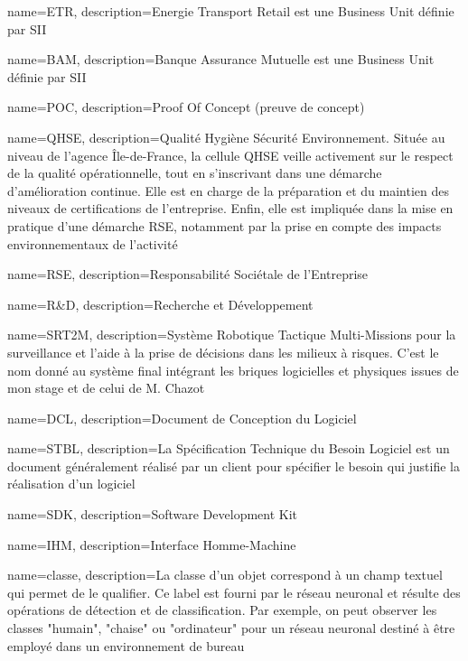 {
  name={ETR},
    description={Energie Transport Retail est une Business Unit définie par SII}
}

{
  name={BAM},
    description={Banque Assurance Mutuelle est une Business Unit définie par SII}
}

{
  name={POC},
    description={Proof Of Concept (preuve de concept)}
}

{
  name={QHSE},
    description={Qualité Hygiène Sécurité Environnement. Située au niveau de l'agence \^{I}le-de-France, la cellule QHSE veille activement sur le respect de la qualité opérationnelle, tout en s'inscrivant dans une démarche d'amélioration continue. 
    Elle est en charge de la préparation et du maintien des niveaux de certifications de l'entreprise.
    Enfin, elle est impliquée dans la mise en pratique d'une démarche \gls{RSE}, notamment par la prise en compte des impacts environnementaux de l'activité}
}

{
  name={RSE},
    description={Responsabilité Sociétale de l'Entreprise}
}

{
  name={R\&D},
    description={Recherche et Développement}
}

{
  name={SRT2M},
    description={Système Robotique Tactique Multi-Missions pour la surveillance et l'aide à la prise de décisions dans les milieux à risques. 
    C'est le nom donné au système final intégrant les briques logicielles et physiques issues de mon stage et de celui de M. Chazot}
}

{
  name={DCL},
    description={Document de Conception du Logiciel}
}

{
  name={STBL},
    description={La Spécification Technique du Besoin Logiciel est un document généralement réalisé par un client pour spécifier le besoin qui justifie la réalisation d'un logiciel}
}

{
  name={SDK},
    description={Software Development Kit}
}

{
  name={IHM},
    description={Interface Homme-Machine}
}

{
  name={classe},
    description={La classe d'un objet correspond à un champ textuel qui permet de le qualifier. Ce label est fourni par le réseau neuronal et résulte des opérations de détection et de classification.
    Par exemple, on peut observer les classes "humain", "chaise" ou "ordinateur" pour un réseau neuronal destiné à être employé dans un environnement de bureau}
}

